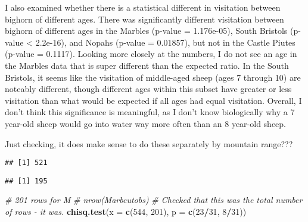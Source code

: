 \documentclass[]{article}
\newenvironment{Shaded}{\begin{snugshade}}{\end{snugshade}}
\newcommand{\CommentTok}[1]{\textcolor[rgb]{0.56,0.35,0.01}{\textit{#1}}}
\newcommand{\DataTypeTok}[1]{\textcolor[rgb]{0.13,0.29,0.53}{#1}}
\newcommand{\DecValTok}[1]{\textcolor[rgb]{0.00,0.00,0.81}{#1}}
\newcommand{\KeywordTok}[1]{\textcolor[rgb]{0.13,0.29,0.53}{\textbf{#1}}}
\newcommand{\NormalTok}[1]{#1}
\newcommand{\OperatorTok}[1]{\textcolor[rgb]{0.81,0.36,0.00}{\textbf{#1}}}
\newcommand{\StringTok}[1]{\textcolor[rgb]{0.31,0.60,0.02}{#1}}
\begin{document}
I also examined whether there is a statistical different in visitation
between bighorn of different ages. There was significantly different
visitation between bighorn of different ages in the Marbles (p-value =
1.176e-05), South Bristols (p-value \textless{} 2.2e-16), and Nopahs
(p-value = 0.01857), but not in the Castle Piutes (p-value = 0.1117).
Looking more closely at the numbers, I do not see an age in the Marbles
data that is super different than the expected ratio. In the South
Bristols, it seems like the visitation of middle-aged sheep (ages 7
through 10) are noteably different, though different ages within this
subset have greater or less visitation than what would be expected if
all ages had equal visitation. Overall, I don't think this significance
is meaningful, as I don't know biologically why a 7 year-old sheep would
go into water way more often than an 8 year-old sheep.

Just checking, it does make sense to do these separately by mountain
range???

\begin{Shaded}
\end{Shaded}

\begin{verbatim}
## [1] 521
\end{verbatim}

\begin{Shaded}
\end{Shaded}

\begin{verbatim}
## [1] 195
\end{verbatim}

\begin{Shaded}
\begin{Highlighting}[]
\CommentTok{# 201 rows for M}
\CommentTok{# nrow(Marbcutobs)}
\CommentTok{# Checked that this was the total number of rows - it was.}
\KeywordTok{chisq.test}\NormalTok{(}\DataTypeTok{x =} \KeywordTok{c}\NormalTok{(}\DecValTok{544}\NormalTok{, }\DecValTok{201}\NormalTok{), }\DataTypeTok{p =} \KeywordTok{c}\NormalTok{(}\DecValTok{23}\OperatorTok{/}\DecValTok{31}\NormalTok{, }\DecValTok{8}\OperatorTok{/}\DecValTok{31}\NormalTok{))}
\end{Highlighting}
\end{Shaded}
\end{document}
